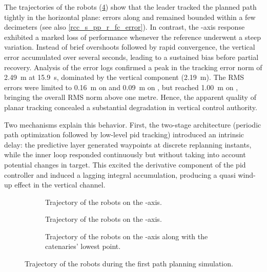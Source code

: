 The trajectories of the robots (\cref{rcc_s_pp_r_fc_poses}) show that the leader tracked the
planned path tightly in the horizontal plane: errors along  and  remained
bounded within a few decimeters (see also \cref{rcc_s_pp_r_fc_error}). In contrast, the
-axis response exhibited a marked loss of performance whenever the reference underwent
a steep variation. Instead of brief overshoots followed by rapid convergence, the vertical error
accumulated over several seconds, leading to a sustained bias before partial recovery. Analysis of
the error logs confirmed a peak in the tracking error norm of \qty{2.49}{\m} at \qty{15.9}{\s},
dominated by the vertical component (\qty{2.19}{\m}). The RMS errors were limited to \qty{0.16}{\m}
on  and \qty{0.09}{\m} on , but reached \qty{1.00}{\m} on ,
bringing the overall RMS norm above one metre. Hence, the apparent quality of planar tracking
concealed a substantial degradation in vertical control authority.

Two mechanisms explain this behavior. First, the two-stage architecture (periodic path optimization
followed by low-level \ac{pid} tracking) introduced an intrinsic delay: the predictive layer
generated waypoints at discrete replanning instants, while the inner loop responded continuously
but without taking into account potential changes in target. This excited the derivative component
of the \ac{pid} controller and induced a lagging integral accumulation, producing a quasi wind-up
effect in the vertical channel.

\begin{figure}
	\centering
	\begin{subfigure}{\figurewidth}
		\centering
		\caption{Trajectory of the robots on the -axis.}
		\label{rcc_s_pp_r_fc_pose_x}
	\end{subfigure}
	\begin{subfigure}{\figurewidth}
		\centering
		\caption{Trajectory of the robots on the -axis.}
		\label{rcc_s_pp_r_fc_pose_y}
	\end{subfigure}
	\begin{subfigure}{\figurewidth}
		\centering
		\caption{Trajectory of the robots on the -axis along with the catenaries' lowest point.}
		\label{rcc_s_pp_r_fc_pose_z}
	\end{subfigure}
	\caption{Trajectory of the robots during the first path planning simulation.}
	\label{rcc_s_pp_r_fc_poses}
\end{figure}

